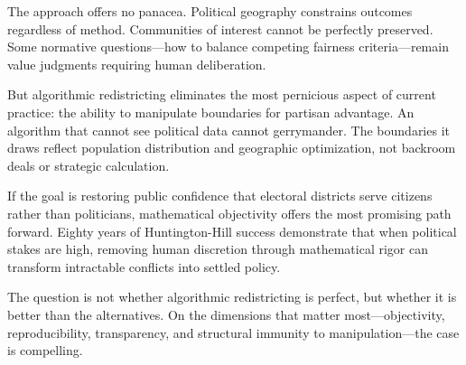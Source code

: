 The approach offers no panacea. Political geography constrains outcomes regardless of method. Communities of interest cannot be perfectly preserved. Some normative questions—how to balance competing fairness criteria—remain value judgments requiring human deliberation.

But algorithmic redistricting eliminates the most pernicious aspect of current practice: the ability to manipulate boundaries for partisan advantage. An algorithm that cannot see political data cannot gerrymander. The boundaries it draws reflect population distribution and geographic optimization, not backroom deals or strategic calculation.

If the goal is restoring public confidence that electoral districts serve citizens rather than politicians, mathematical objectivity offers the most promising path forward. Eighty years of Huntington-Hill success demonstrate that when political stakes are high, removing human discretion through mathematical rigor can transform intractable conflicts into settled policy.

The question is not whether algorithmic redistricting is perfect, but whether it is better than the alternatives. On the dimensions that matter most—objectivity, reproducibility, transparency, and structural immunity to manipulation—the case is compelling.
